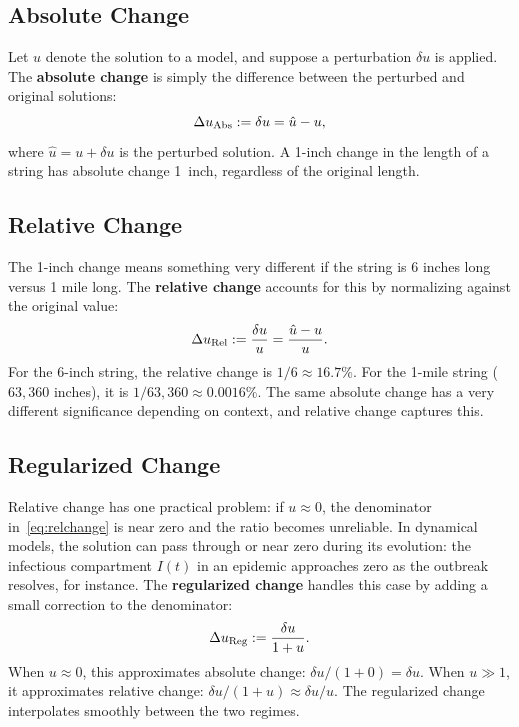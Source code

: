 \subsection{Absolute Change}

Let $u$ denote the solution to a model, and suppose a perturbation
$\delta u$ is applied. The \textbf{absolute change} is simply the
difference between the perturbed and original solutions:
\begin{equation}
  \Delta u_{\mathrm{Abs}} := \delta u = \hat{u} - u,
  \label{eq:abschange}
\end{equation}
where $\hat{u} = u + \delta u$ is the perturbed solution.
A 1-inch change in the length of a string has absolute change
1~inch, regardless of the original length.

\subsection{Relative Change}

The 1-inch change means something very different if the string is
6 inches long versus 1 mile long.
The \textbf{relative change} accounts for this by normalizing against
the original value:
\begin{equation}
  \Delta u_{\mathrm{Rel}} := \frac{\delta u}{u} = \frac{\hat{u} - u}{u}.
  \label{eq:relchange}
\end{equation}
For the 6-inch string, the relative change is $1/6 \approx 16.7\%$.
For the 1-mile string ($63{,}360$ inches), it is $1/63{,}360 \approx 0.0016\%$.
The same absolute change has a very different significance depending
on context, and relative change captures this.

\subsection{Regularized Change}
\label{subsec:regularized}

Relative change has one practical problem: if $u \approx 0$,
the denominator in~\eqref{eq:relchange} is near zero and the
ratio becomes unreliable.
In dynamical models, the solution can pass through or near zero
during its evolution: the infectious compartment $I(t)$ in an epidemic
approaches zero as the outbreak resolves, for instance.
The \textbf{regularized change} handles this case by adding a
small correction to the denominator:
\begin{equation}
  \Delta u_{\mathrm{Reg}} := \frac{\delta u}{1 + u}.
  \label{eq:regchange}
\end{equation}
When $u \approx 0$, this approximates absolute change: $\delta u / (1 + 0) = \delta u$.
When $u \gg 1$, it approximates relative change: $\delta u / (1 + u) \approx \delta u / u$.
The regularized change interpolates smoothly between the two regimes.

